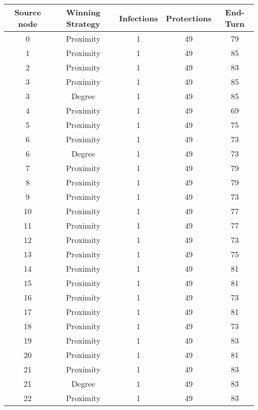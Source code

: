 \documentclass[results.tex]{subfiles}
\begin{document}
\begin{center}
  \begin{tabular}{| c || c | c | c | c |}
    \hline
    {\bfseries Source node} & {\bfseries Winning Strategy} & {\bfseries Infections} & {\bfseries Protections} & {\bfseries End-Turn} \\  %
    \hline\hline
    0 & Proximity & 1 & 49 & 79 \\ 
    \hline
    1 & Proximity & 1 & 49 & 85 \\ 
    \hline
    2 & Proximity & 1 & 49 & 83 \\ 
    \hline
    3 & Proximity & 1 & 49 & 85 \\ 
    \hline
    3 & Degree & 1 & 49 & 85 \\ 
    \hline
    4 & Proximity & 1 & 49 & 69 \\ 
    \hline
    5 & Proximity & 1 & 49 & 75 \\ 
    \hline
    6 & Proximity & 1 & 49 & 73 \\ 
    \hline
    6 & Degree & 1 & 49 & 73 \\ 
    \hline
    7 & Proximity & 1 & 49 & 79 \\ 
    \hline
    8 & Proximity & 1 & 49 & 79 \\ 
    \hline
    9 & Proximity & 1 & 49 & 73 \\ 
    \hline
    10 & Proximity & 1 & 49 & 77 \\ 
    \hline
    11 & Proximity & 1 & 49 & 77 \\ 
    \hline
    12 & Proximity & 1 & 49 & 73 \\ 
    \hline
    13 & Proximity & 1 & 49 & 75 \\ 
    \hline
    14 & Proximity & 1 & 49 & 81 \\ 
    \hline
    15 & Proximity & 1 & 49 & 81 \\ 
    \hline
    16 & Proximity & 1 & 49 & 73 \\ 
    \hline
    17 & Proximity & 1 & 49 & 81 \\ 
    \hline
    18 & Proximity & 1 & 49 & 73 \\ 
    \hline
    19 & Proximity & 1 & 49 & 83 \\ 
    \hline
    20 & Proximity & 1 & 49 & 81 \\ 
    \hline
    21 & Proximity & 1 & 49 & 83 \\ 
    \hline
    21 & Degree & 1 & 49 & 83 \\ 
    \hline
    22 & Proximity & 1 & 49 & 83 \\ 

\end{tabular}
\end{center}
\end{document}
